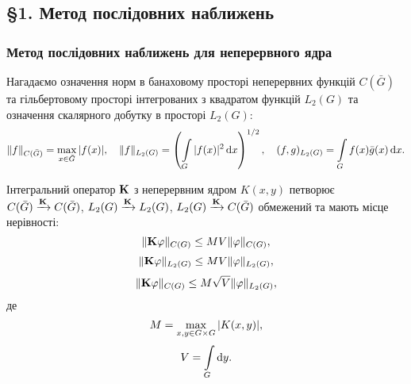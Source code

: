 \subsection*{\S1. Метод послідовних наближень}

\subsubsection*{Метод послідовних наближень для неперервного ядра}

Нагадаємо означення норм в банаховому просторі неперервних функцій $C(\bar G)$ та гільбертовому просторі інтегрованих з квадратом функцій $L_2(G)$ та означення скалярного добутку в просторі $L_2(G)$:
\[ \|f\|_{C(\bar G)} = \Max_{x \in \bar G} |f(x)|, \quad \|f\|_{L_2(G)} = \left( \Int_G |f(x)|^2 \diff x \right)^{1/2}, \quad (f, g)_{L_2(G)} = \Int_G f(x) \bar g(x) \diff x. \]

\begin{lemma} 
	Інтегральний оператор $\bf{K}$ з неперервним ядром $K(x, y)$ петворює $C(\bar G) \xrightarrow{\bf{K}} C(\bar G)$, $L_2(G) \xrightarrow{\bf{K}} L_2(G)$, $L_2(G) \xrightarrow{\bf{K}} C(\bar G)$ обмежений та мають місце нерівності:
	\begin{equation}
		\label{eq:1.1}
		\| \bf{K} \phi \|_{C(G)} \le M V \| \phi \|_{C(G)},
	\end{equation}
	\begin{equation}
		\label{eq:1.2}
		\| \bf{K} \phi \|_{L_2(G)} \le M V \| \phi \|_{L_2(G)},
	\end{equation}
	\begin{equation}
		\label{eq:1.3}
		\| \bf{K} \phi \|_{C(G)} \le M \sqrt{V} \| \phi \|_{L_2(G)},
	\end{equation}
	де
	\begin{equation}
		\label{eq:1.4}
		M = \Max_{x, y \in G \times G} |K(x, y)|,
	\end{equation}
	\begin{equation}
		\label{eq:1.5}
		V = \Int_G \diff y.
	\end{equation}
\end{lemma}

